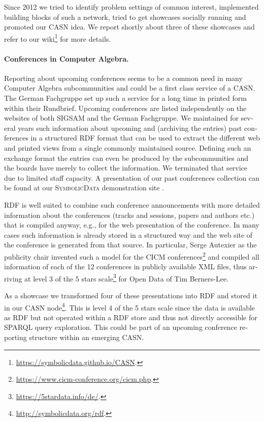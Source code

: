 \documentclass[11pt]{article}
\def\SD{\textsc{SymbolicData}}
\begin{document}
\begin{otherlanguage}{english}
\begin{multicols}{2}
Since 2012 we tried to identify problem settings of common interest,
implemented building blocks of such a network, tried to get showcases socially
running and promoted our CASN idea.  We report shortly about three of these
showcases and refer to our
wiki\footnote{\url{https://symbolicdata.github.io/CASN}.} for more details.

\paragraph{Conferences in Computer Algebra.}
Reporting about upcoming conferences seems to be a common need in many Computer
Algebra subcommunities and could be a first class service of a CASN. The German
Fachgruppe set up such a service for a long time in printed form within their
Rundbrief.  Upcoming conferences are listed independently on the websites of
both SIGSAM and the German Fachgruppe.  We maintained for several years such
information about upcoming and (archiving the entries) past conferences in a
structured RDF format that can be used to extract the different web and printed
views from a single commonly maintained source.  Defining such an exchange
format the entries can even be produced by the subcommunities and the boards
have merely to collect the information.  We terminated that service due to
limited staff capacity. A presentation of our past conferences collection can
be found at our {\SD} demonstration site \cite{sdinfo}.

RDF is well suited to combine such conference announcements with more detailed
information about the conferences (tracks and sessions, papers and authors
etc.) that is compiled anyway, e.g., for the web presentation of the
conference.  In many cases such information is already stored in a structured
way and the web site of the conference is generated from that source.  In
particular, Serge Autexier as the publicity chair invented such a model for
the CICM conferences\footnote{\url{https://www.cicm-conference.org/cicm.php}.}
and compiled all information of each of the 12 conferences in publicly
available XML files, thus arriving at level 3 of the 5 stars
scale\footnote{\url{https://5stardata.info/de/}.} for Open Data of Tim
Berners-Lee.

As a showcase we transformed four of these presentations into RDF and stored it
in our CASN node\footnote{\url{http://symbolicdata.org/rdf}.}. This is level 4
of the 5 stars scale since the data is available as RDF but not operated within
a RDF store and thus not directly accessible for SPARQL query exploration.
This could be part of an upcoming conference reporting structure within an
emerging CASN. 


\end{multicols}
\end{otherlanguage}
\end{document}
